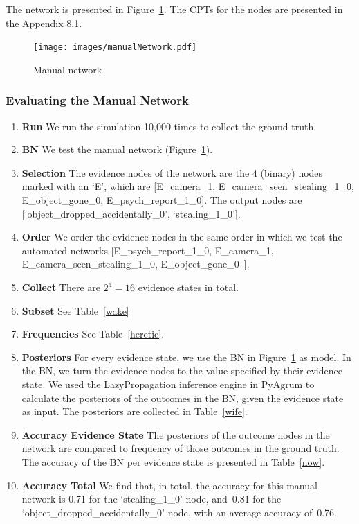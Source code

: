 \documentclass[12pt]{article}
\begin{document}
\begin{enumerate}
The network is presented in Figure~\ref{hebben}. The CPTs for the nodes are presented in the Appendix 8.1.
 
 \end{enumerate}
 
 
\begin{figure}[htbp]
\begin{center}
\texttt{[image: images/manualNetwork.pdf]}
\caption{Manual network}
\label{hebben}
\end{center}
\end{figure}


\subsubsection{Evaluating the Manual Network}

\begin{enumerate}
\item \textbf{Run} We run the simulation 10,000 times to collect the ground truth.
\item \textbf{BN} We test the manual network (Figure~\ref{hebben}).
\item \textbf{Selection} The evidence nodes of the network are the 4 (binary) nodes marked with an `E', which are [E\_camera\_1, E\_camera\_seen\_stealing\_1\_0, E\_object\_gone\_0, E\_psych\_report\_1\_0]. The output nodes are [`object\_dropped\_accidentally\_0', `stealing\_1\_0'].
\item \textbf{Order} We order the evidence nodes in the same order in which we test the automated networks [E\_psych\_report\_1\_0, E\_camera\_1,  E\_camera\_seen\_stealing\_1\_0, E\_object\_gone\_0~].
\item \textbf{Collect} There are $2^4 = 16$ evidence states in total.
\item \textbf{Subset} See Table~\ref{wake}
\item \textbf{Frequencies} See Table~\ref{heretic}.
\item \textbf{Posteriors} For every evidence state, we use the BN in Figure~\ref{hebben} as model. In the BN, we turn the evidence nodes to the value specified by their evidence state. We used the LazyPropagation inference engine in PyAgrum to calculate the posteriors of the outcomes in the BN, given the evidence state as input. The posteriors are collected in Table~\ref{wife}. 
\item \textbf{Accuracy Evidence State} The posteriors of the outcome nodes in the network are compared to frequency of those outcomes in the ground truth. The accuracy of the BN per evidence state is presented in Table~\ref{now}.
\item \textbf{Accuracy Total} We find that, in total, the accuracy for this manual network is 0.71 for the `stealing\_1\_0' node, and~0.81 for the `object\_dropped\_accidentally\_0' node, with an average accuracy of~0.76. 
\end{enumerate}
\end{document}
